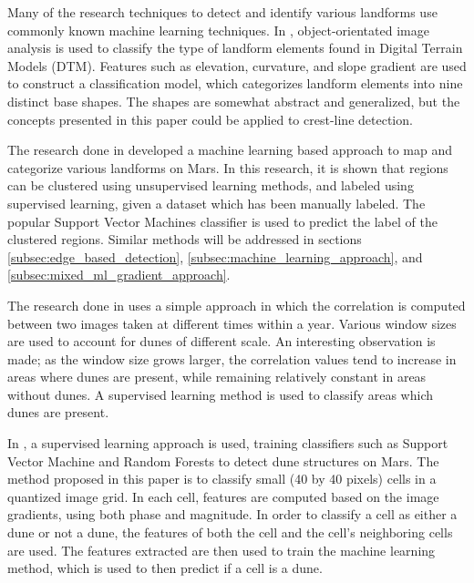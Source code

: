 Many of the research techniques to detect and identify various landforms use commonly known machine learning techniques. In \cite{2006_automated_classification_landform_elements}, object-orientated image analysis is used to classify the type of landform elements found in Digital Terrain Models (DTM). Features such as elevation, curvature, and slope gradient are used to construct a classification model, which categorizes landform elements into nine distinct base shapes. The shapes are somewhat abstract and generalized, but the concepts presented in this paper could be applied to crest-line detection.

The research done in \cite{2007_Machine_Learning_tools_automatic_mapping_mars} developed a machine learning based approach to map and categorize various landforms on Mars. In this research, it is shown that regions can be clustered using unsupervised learning methods, and labeled using supervised learning, given a dataset which has been manually labeled. The popular Support Vector Machines classifier is used to predict the label of the clustered regions. Similar methods will be addressed in sections \ref{subsec:edge_based_detection}, \ref{subsec:machine_learning_approach}, and \ref{subsec:mixed_ml_gradient_approach}.

The research done in \cite{2013_sar_image_automated_detection_dune_area} uses a simple approach in which the correlation is computed between two images taken at different times within a year. Various window sizes are used to account for dunes of different scale. An interesting observation is made; as the window size grows larger, the correlation values tend to increase in areas where dunes are present, while remaining relatively constant in areas without dunes. A supervised learning method is used to classify areas which dunes are present.

In \cite{BandeiraMarques}, a supervised learning approach is used, training classifiers such as Support Vector Machine and Random Forests to detect dune structures on Mars. The method proposed in this paper is to classify small (40 by 40 pixels) cells in a quantized image grid. In each cell, features are computed based on the image gradients, using both phase and magnitude. In order to classify a cell as either a dune or not a dune, the features of both the cell and the cell's neighboring cells are used. The features extracted are then used to train the machine learning method, which is used to then predict if a cell is a dune.

